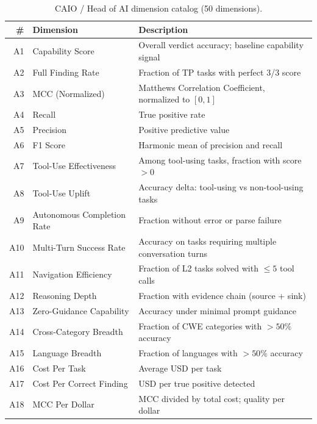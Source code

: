 \documentclass[10pt,twocolumn]{article}
\begin{document}
\begin{table}[t]
\centering
\caption{CAIO / Head of AI dimension catalog (50 dimensions).}
\label{tab:caio_dims}
\small
\begin{tabular}{@{}r l p{7.5cm}@{}}
\toprule
\textbf{\#} & \textbf{Dimension} & \textbf{Description} \\
\midrule
A1  & Capability Score                    & Overall verdict accuracy; baseline capability signal \\
A2  & Full Finding Rate                   & Fraction of TP tasks with perfect 3/3 score \\
A3  & MCC (Normalized)                    & Matthews Correlation Coefficient, normalized to $[0,1]$ \\
A4  & Recall                              & True positive rate \\
A5  & Precision                           & Positive predictive value \\
A6  & F1 Score                            & Harmonic mean of precision and recall \\
A7  & Tool-Use Effectiveness              & Among tool-using tasks, fraction with score ${>}0$ \\
A8  & Tool-Use Uplift                     & Accuracy delta: tool-using vs non-tool-using tasks \\
A9  & Autonomous Completion Rate          & Fraction without error or parse failure \\
A10 & Multi-Turn Success Rate             & Accuracy on tasks requiring multiple conversation turns \\
A11 & Navigation Efficiency               & Fraction of L2 tasks solved with ${\leq}5$ tool calls \\
A12 & Reasoning Depth                     & Fraction with evidence chain (source + sink) \\
A13 & Zero-Guidance Capability            & Accuracy under minimal prompt guidance \\
A14 & Cross-Category Breadth              & Fraction of CWE categories with ${>}50\%$ accuracy \\
A15 & Language Breadth                    & Fraction of languages with ${>}50\%$ accuracy \\
A16 & Cost Per Task                       & Average USD per task \\
A17 & Cost Per Correct Finding            & USD per true positive detected \\
A18 & MCC Per Dollar                      & MCC divided by total cost; quality per dollar \\

\end{tabular}
\end{table}
\end{document}
